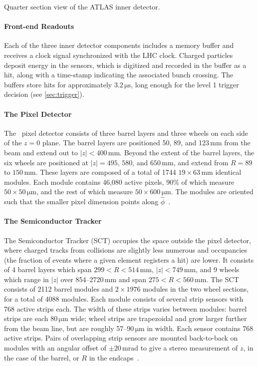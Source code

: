 \begin{cfig}
  \caption[ATLAS inner detector geometry]{Quarter section view of the ATLAS inner detector.}
  \label{fig:atlas-id-acceptance}
\end{cfig}

\paragraph{Front-end Readouts} Each of the three inner detector components includes a memory buffer and receives a clock signal synchronized with the LHC clock.
Charged particles deposit energy in the sensors, which is digitized and recorded in the buffer as a hit, along with a time-stamp indicating the associated bunch crossing.
The buffers store hits for approximately $3.2\,\mathrm{\mu s}$, long enough for the level 1 trigger decision (see \cref{sec:trigger}).

\paragraph{The Pixel Detector} The \atlas\ pixel detector consists of three barrel layers and three wheels on each side of the $z = 0$ plane.
The barrel layers are positioned 50, 89, and 123$\,\mathrm{mm}$ from the beam and extend out to $|z| < 400\,\mathrm{mm}$.
Beyond the extent of the barrel layers, the six wheels are positioned at $|z| = 495$, $580$, and $650\,\mathrm{mm}$, and extend from $R = 89$ to $150\,\mathrm{mm}$.
These layers are composed of a total of 1744 $19 \times 63\,\mathrm{mm}$ identical modules.
Each module contains 46,080 active pixels, 90\% of which measure $50 \times 50\,\mathrm{\mu m}$, and the rest of which measure $50 \times 600\,\mathrm{\mu m}$.
The modules are oriented such that the smaller pixel dimension points along $\hat{\phi}$~\cite{DetPap}.

\paragraph{The Semiconductor Tracker}
The Semiconductor Tracker (SCT) occupies the space outside the pixel detector, where charged tracks from collisions are slightly less numerous and occupancies (the fraction of events where a given element registers a hit) are lower.
It consists of 4 barrel layers which span $299 < R < 514\,\mathrm{mm}$, $|z| < 749\,\mathrm{mm}$, and 9 wheels which range in $|z|$ over 854--2720$\,\mathrm{mm}$ and span $275 < R < 560\,\mathrm{mm}$.
The SCT consists of 2112 barrel modules and $2 \times 1976$ modules in the two wheel sections, for a total of 4088 modules.
Each module consists of several strip sensors with 768 active strips each.
The width of these strips varies between modules: barrel strips are each $80\,\mathrm{\mu m}$ wide; wheel strips are trapezoidal and grow larger further from the beam line, but are roughly 57--90$\,\mathrm{\mu m}$ in width.
Each sensor contains 768 active strips.
Pairs of overlapping strip sensors are mounted back-to-back on modules with an angular offset of $\pm 20\,\mathrm{mrad}$ to give a stereo measurement of $z$, in the case of the barrel, or $R$ in the endcaps~\cite{DetPap}.

